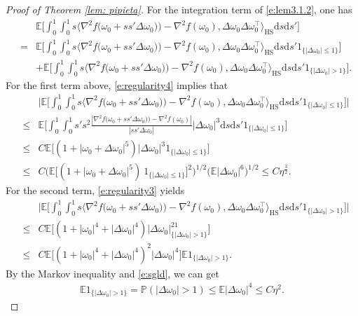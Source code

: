 \documentclass[12pt]{amsart}
\theoremstyle{definition}
\theoremstyle{remark}
\numberwithin{equation}{section}
\newcommand{\dif}{\mathrm{d}}
\newcommand{\E}{\mathbb{E}}            %
\newcommand{\Ll}{\langle}
\newcommand{\Rr}{\rangle}
\newcommand{\PP}{\mathbb{P}}
\begin{document}
\begin{proof}[Proof of Theorem \ref{lem: pipieta}]
For the integration term of \eqref{e:lem3.1.2}, one has
\begin{eqnarray*}
&&\E\big[\int_0^1\int_0^1 s\Ll \nabla^2f\big(\omega_0+ss'\Delta\omega_0)\big)-\nabla^2f(\omega_0),\Delta\omega_0\Delta\omega_0^\top    \Rr_{\text {HS}}\dif s\dif s'\big]\\
&=&\E\big[\int_0^1\int_0^1 s\Ll \nabla^2f\big(\omega_0+ss'\Delta\omega_0)\big)-\nabla^2f(\omega_0),\Delta\omega_0\Delta\omega_0^\top     \Rr_{\text {HS}}\dif s\dif s'1_{\{|\Delta\omega_0|\le1\}}\big]\\
&&+\E\big[\int_0^1\int_0^1 s\Ll \nabla^2f\big(\omega_0+ss'\Delta\omega_0)\big)-\nabla^2f(\omega_0),\Delta\omega_0\Delta\omega_0^\top     \Rr_{\text {HS}}\dif s\dif s'1_{\{|\Delta\omega_0|>1\}}\big].
\end{eqnarray*}
For the first term above, \eqref{e:regularity4} implies that
\begin{eqnarray*}
&& \big|\E\big[\int_0^1\int_0^1 s\Ll \nabla^2f\big(\omega_0+ss'\Delta\omega_0)\big)-\nabla^2f(\omega_0),\Delta\omega_0\Delta\omega_0^\top     \Rr_{\text {HS}}\dif s\dif s'1_{\{|\Delta\omega_0|\le1\}}\big]\big|\\
&\le&\E\big[\int_0^1\int_0^1 s' s^2 \frac{|\nabla^2f\big(\omega_0+ss'\Delta\omega_0)\big)-\nabla^2f(\omega_0)|}{|ss'\Delta\omega_0|}|\Delta\omega_0|^3 \dif s\dif s'1_{\{|\Delta\omega_0|\le1\}}\big]\\
&\le& C\E\big[(1+|\omega_0+\Delta\omega_0|^5)|\Delta\omega_0|^3 1_{\{|\Delta\omega_0|\le1\}}\big]\\
&\le& C\big(\E\big[(1+|\omega_0+\Delta\omega_0|^5)\ 1_{\{|\Delta\omega_0|\le1\}}\big]^2\big)^{1/2} \big(\E|\Delta\omega_0|^6\big)^{1/2}
\le C\eta^{\frac32}.
\end{eqnarray*}
For the second term, \eqref{e:regularity3} yields
\begin{eqnarray*}
&&\big|\E\big[\int_0^1\int_0^1 s\Ll \nabla^2f\big(\omega_0+ss'\Delta\omega_0)\big)-\nabla^2f(\omega_0),\Delta\omega_0\Delta\omega_0^\top     \Rr_{\text {HS}}\dif s\dif s' 1_{\{|\Delta\omega_0|>1\}}\big]\big|\\
&\le&C\E\big[(1+|\omega_0|^4+|\Delta\omega_0|^4)|\Delta\omega_0|^21_{\{|\Delta\omega_0|>1\}}\big]\\
&\le&C\E\big[(1+|\omega_0|^4+|\Delta\omega_0|^4)^2|\Delta\omega_0|^4\big]\E1_{\{|\Delta\omega_0|>1\}}.
\end{eqnarray*}
By the Markov inequality and \eqref{e:sgld}, we can get
\begin{eqnarray*}
\E1_{\{|\Delta\omega_0|>1\}}=\PP(|\Delta\omega_0|>1)\le \E|\Delta\omega_0|^4\le C\eta^2.

\end{eqnarray*}
\end{proof}
\end{document}
